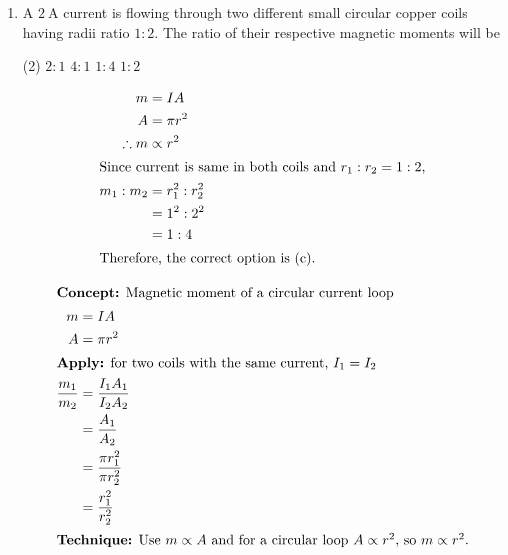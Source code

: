 \begin{enumerate}[leftmargin=*]
\item A $2 \ \mathrm{A}$ current is flowing through two different small circular copper coils having radii ratio $1 : 2$. The ratio of their respective magnetic moments will be
\begin{tasks}(2)
    \task $2 : 1$
    \task $4 : 1$
    \task $1 : 4$ \ans
    \task $1 : 2$
\end{tasks}
\begin{solution}
    \begin{align*}
    m &= I A\\
    A &= \pi r^2\\
    \therefore m &\propto r^2\\
    \intertext{Since current is same in both coils and $r_1 : r_2 = 1 : 2$,}
    m_1 : m_2 &= r_1^2 : r_2^2\\
    &= 1^2 : 2^2\\
    &= 1 : 4\\
    \intertext{Therefore, the correct option is (c).}
    \end{align*}
\end{solution}

\begin{idea}
    \begin{align*}
    \intertext{\textbf{Concept:} Magnetic moment of a circular current loop}
    m &= IA \\
    A &= \pi r^2 \\
    \intertext{\textbf{Apply:} for two coils with the same current, $I_1=I_2$}
    \frac{m_1}{m_2} &= \frac{I_1A_1}{I_2A_2} \\
    &= \frac{A_1}{A_2} \\
    &= \frac{\pi r_1^2}{\pi r_2^2} \\
    &= \frac{r_1^2}{r_2^2} \\
    \intertext{\textbf{Technique:} Use $m \propto A$ and for a circular loop $A \propto r^2$, so $m \propto r^2$.}
    \end{align*}
\end{idea}
\end{enumerate}
